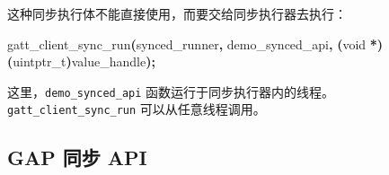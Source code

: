 \documentclass[
  12pt,
]{book}
\newenvironment{Shaded}{\begin{snugshade}}{\end{snugshade}}
\newcommand{\DataTypeTok}[1]{\textcolor[rgb]{0.13,0.29,0.53}{#1}}
\newcommand{\NormalTok}[1]{#1}
\newcommand{\OperatorTok}[1]{\textcolor[rgb]{0.81,0.36,0.00}{\textbf{#1}}}
\begin{document}
这种同步执行体不能直接使用，而要交给同步执行器去执行：

\begin{Shaded}
\begin{Highlighting}[]
\NormalTok{gatt\_client\_sync\_run}\OperatorTok{(}\NormalTok{synced\_runner}\OperatorTok{,}\NormalTok{ demo\_synced\_api}\OperatorTok{,}
    \OperatorTok{(}\DataTypeTok{void} \OperatorTok{*)(}\DataTypeTok{uintptr\_t}\OperatorTok{)}\NormalTok{value\_handle}\OperatorTok{);}
\end{Highlighting}
\end{Shaded}

这里，\texttt{demo\_synced\_api} 函数运行于同步执行器内的线程。\texttt{gatt\_client\_sync\_run} 可以从任意线程调用。

\hypertarget{gap-ux540cux6b65-api}{%
\subsection{GAP 同步 API}\label{gap-ux540cux6b65-api}}
\end{document}
